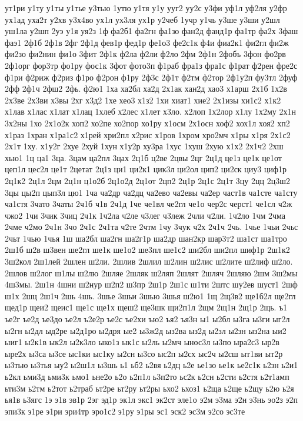 {ут1ри
у1ту
у1ты
у1тье
у3тью
1утю
у1тя
у1у
ууг2
уу2с
у3фи
уф1л
уф2ля
у2фр
ух1ад
уха2т
у2хв
у3х4во
ух1л
ух3ля
ух1р
у2чеб
1учр
у1чь
у3ше
у3ши
у2шл
уш1ла
у2шп
2уэ
у1я
уя2з
1ф
фа2б1
фа2гн
фа1зо
фан2д
фанд1р
фа1тр
фа2х
3фаш
фаэ1
2ф1б
2ф1в
2фг
2ф1д
фев1р
фед1р
фе1о3
фе2с1к
ф4и
фиа2к1
фи2гл
фи2ж
фи2зо
фи2нин
фи1о
3фит
2ф1к
ф2ла
ф2ли
ф2ло
2фм
2ф1н
2фобъ
3фон
фо2рв
2ф1орг
фор3тр
фо1ру
фос1к
3фот
фото3п
ф1раб
фра1з
фра1с
ф1рат
ф2рен
фре2с
ф1ри
ф2риж
ф2риз
ф1ро
ф2рон
ф1ру
2ф3с
2ф1т
ф2тм
ф2тор
2ф1у2п
фу3тл
2фуф
2фф
2ф1ч
2фш2
2фь.
ф2ю1
1ха
ха2бл
ха2д
2х1ак
хан2д
хао3
х1арш
2х1б
1х2в
2х3ве
2х3ви
х3вы
2хг
х3д2
1хе
хео3
х1з2
1хи
хиат1
хие2
2х1изы
хи1с2
х1к2
х1лав
х1лас
х1лат
х1лац
1хлеб
х2лес
х1лет
х3ло.
х2лоп
1х2лор
х1лу
1х2му
2х1н
3х2ны
1хо
2х1о2к
хоп2
хо2пе
хо2пор
хо1ру
х1осм
2х1осн
хоф2
хох1л
хоя2
хп2
х1раз
1хран
х1ра1с2
х1рей
хри2пл
х2рис
х1ров
1хром
хро2мч
х1ры
х1ря
2х1с2
2х1т
1ху.
х1у2г
2хуе
2хуй
1хун
х1у2р
ху3ра
1хус
1хуш
2хую
х1х2
2х1ч2
2хш
хью1
1ц
ца1
3ца.
3цам
ца2пл
3цах
2ц1б
ц2ве
2цвы
2цг
2ц1д
це1з
це1к
це1от
цеп1л
цес2л
це1т
2цетат
2ц1з
ци1
ци2к1
цик3л
ци2ол
цип2
ци2ск
циу3
циф1р
2ц1к2
2ц1л
2цм
2ц1н
ц1о2б
2ц1о2д
2ц1от
2цп2
2ц1р
2ц1с
2ц1т
3цу
2цц
2ц3ш2
3цы
цы2п
цып3л
цю1
1ча
ча2др
ча2дц
ча2ево
ча2евы
ча2ер
част1в
ча1сте
ча1сту
ча1стя
3чато
3чаты
2ч1б
ч1в
2ч1д
1че
че1вл
че2гл
че1о
чер2с
черст1
че1сл
ч2ж
чжо2
1чи
3чик
3чиц
2ч1к
1ч2ла
ч2ле
ч3лег
ч3леж
2чли
ч2ли.
1ч2ло
1чм
2чма
2чме
ч2мо
2ч1н
3чо
2ч1с
2ч1та
ч2те
2чтм
1чу
3чук
ч2х
2ч1ч
2чь.
1чье
1чьи
2чьс
2чьт
1чью
1чья
1ш
ша2бл
ша2гн
ша2г1р
ша2др
шан2кр
шар3т2
ша1ст
ша1тро
2ш1б
ш2в
ш3вен
ше2гл
ше1к
ше1о2
ше3пл
ше1с2
ши2бл
ши2пл
шиф1р
2ш1к2
3ш2кол
2ш1лей
2шлен
ш2ли.
2шлив
2шлил
ш2лин
ш2лис
ш2лите
ш2лиф
ш2ло.
2шлов
ш2лог
ш1лы
ш2лю
2шляе
2шляк
ш2ляп
2шлят
2шляч
2шляю
2шм
3ш2мы
4ш3мы.
2ш1н
4шни
ш2нур
ш2п2
ш3пр
2ш1р
2ш1с
ш1ти
2штс
шу2ев
шуст1
2шф
ш1х
2шц
2ш1ч
2шь
4шь.
3шье
3шьи
3шью
3шья
ш2ю1
1щ
2щ3в2
ще1б2л
ще2гл
щед1р
щеи2
щеис1
ще1с
ще1х
щеш2
ще3шк
щи2п1л
2щм
2щ1н
2щ1р
2щь.
ъ1
ъе2г
ъе2д
ъе3до
ъе2л
ъ2е2р
ъе2с
ъе2хи
ъю2
ъя2
ъя3н
ы1
ы2бл
ы3га
ы3ги
ыг2л
ы2гн
ы2дл
ыд2ре
ы2д1ро
ы2дря
ые2
ы3ж2д
ыз2ва
ыз2д
ы2зл
ы2зн
ыз2на
ыи2
ыиг1
ы2к1в
ык2л
ы2к3ло
ыко1з
ык1с
ы2ль
ы2мч
ынос3л
ы3по
ыра2с3
ыр2в
ыре2х
ы3са
ы3се
ыс1ки
ыс1ку
ы2сн
ы3со
ыс2п
ы2сх
ыс2ч
ы2сш
ыт1ви
ыт2р
ы3тью
ы3тья
ыу2
ы2ш1л
ы3шь
ь1
ьб2
ь2вя
ь2дц
ь2е
ье1зо
ье1к
ье2с1к
ь2зн
ь2и1
ь2кл
ьми3д
ьми3к
ьмо1
ьне2о
ь2о
ь2п1л
ь3п2то
ьс2к
ь2сн
ь2сти
ь2стя
ь2т1амп
ьти3м
ь2тм
ь2тот
ь2траб
ьт2ре
ьт2ру
ьт2ры
ьхо2
ьхоз1
ь2ща
ь2ще
ь2щу
ь2ю
ь2я
ья1в
ь3ягс
1э
э1в
эв1р
2эг
эд1р
эк1л
экс1
эк2ст
эле1о
э2м
э3ма
э2н
э3нь
эо2з
э2п
эпи3к
э1ре
э1ри
эри4тр
эро1с2
э1ру
э1ры
эс1
эск2
эс3м
э2со
эс3те
}
